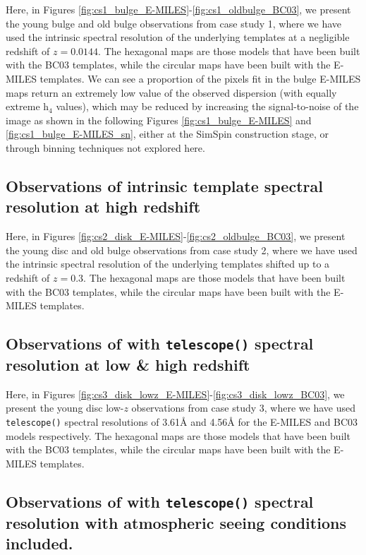 \documentclass[
  journal=pasa,
  manuscript=research-paper, %
  year=2020,
  volume=37,
]{cup-journal}
\newcommand{\telescope}[1]{\texttt{telescope()}#1}
\begin{document}
Here, in Figures \ref{fig:cs1_bulge_E-MILES}-\ref{fig:cs1_oldbulge_BC03}, we present the young bulge and old bulge observations from case study 1, where we have used the intrinsic spectral resolution of the underlying templates at a negligible redshift of $z = 0.0144$. The hexagonal maps are those models that have been built with the BC03 templates, while the circular maps have been built with the E-MILES templates. We can see a proportion of the pixels fit in the bulge E-MILES maps return an extremely low value of the observed dispersion (with equally extreme h$_4$ values), which may be reduced by increasing the signal-to-noise of the image as shown in the following Figures \ref{fig:cs1_bulge_E-MILES} and \ref{fig:cs1_bulge_E-MILES_sn}, either at the SimSpin construction stage, or through binning techniques not explored here.  

\subsection{Observations of intrinsic template spectral resolution at high redshift}
\label{app:cs2}

Here, in Figures \ref{fig:cs2_disk_E-MILES}-\ref{fig:cs2_oldbulge_BC03}, we present the young disc and old bulge observations from case study 2, where we have used the intrinsic spectral resolution of the underlying templates shifted up to a redshift of $z = 0.3$. The hexagonal maps are those models that have been built with the BC03 templates, while the circular maps have been built with the E-MILES templates. 

\subsection{Observations of with \telescope{} spectral resolution at low \& high redshift}
\label{app:cs3}

Here, in Figures \ref{fig:cs3_disk_lowz_E-MILES}-\ref{fig:cs3_disk_lowz_BC03}, we present the young disc low-$z$ observations from case study 3, where we have used \telescope{} spectral resolutions of 3.61\AA{} and 4.56\AA{} for the E-MILES and BC03 models respectively. The hexagonal maps are those models that have been built with the BC03 templates, while the circular maps have been built with the E-MILES templates. 

\subsection{Observations of with \telescope{} spectral resolution with atmospheric seeing conditions included.}
\label{app:cs4}
\end{document}
